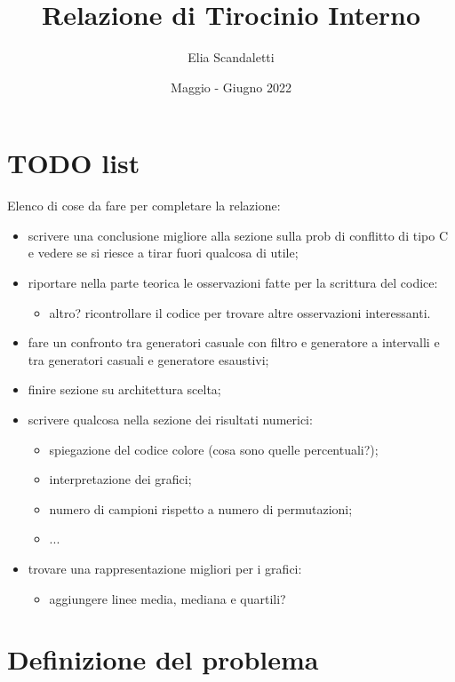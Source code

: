 

\title{Relazione di Tirocinio Interno}
\author{Elia Scandaletti}
\date{Maggio - Giugno 2022}



\maketitle
\tableofcontents

\section*{TODO list}
Elenco di cose da fare per completare la relazione:
\begin{itemize}
    \item scrivere una conclusione migliore alla sezione sulla prob di conflitto di tipo C e vedere se si riesce a tirar fuori qualcosa di utile;
    \item riportare nella parte teorica le osservazioni fatte per la scrittura del codice:
    \begin{itemize}
        \item altro? ricontrollare il codice per trovare altre osservazioni interessanti.
    \end{itemize}
    \item fare un confronto tra generatori casuale con filtro e generatore a intervalli e tra generatori casuali e generatore esaustivi;
    \item finire sezione su architettura scelta;
    \item scrivere qualcosa nella sezione dei risultati numerici:
    \begin{itemize}
        \item spiegazione del codice colore (cosa sono quelle percentuali?);
        \item interpretazione dei grafici;
        \item numero di campioni rispetto a numero di permutazioni;
        \item ...
    \end{itemize}
    \item trovare una rappresentazione migliori per i grafici:
    \begin{itemize}
        \item aggiungere linee media, mediana e quartili?
    \end{itemize}
\end{itemize}

\section{Definizione del problema}


